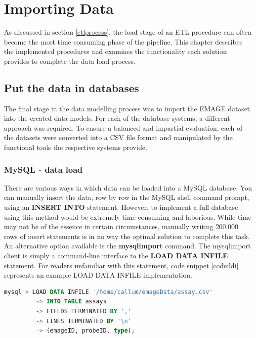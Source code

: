 \chapter{Importing Data}\label{dataload}
As discussed in section \ref{etlprocess}, the load stage of an ETL procedure can often become the most time consuming phase of the pipeline. This chapter describes the implemented procedures and examines the functionality each solution provides to complete the data load process.

\section{Put the data in databases}\label{loadsection}
The final stage in the data modelling process was to import the EMAGE dataset into the created data models. For each of the database systems, a different approach was required. To ensure a balanced and impartial evaluation, each of the datasets were converted into a CSV file format and manipulated by the functional tools the respective systems provide.

\subsection{MySQL - data load}
There are various ways in which data can be loaded into a MySQL database. You can manually insert the data, row by row in the MySQL shell command prompt, using an \textbf{INSERT INTO} statement. However, to implement a full database using this method would be extremely time consuming and laborious. While time may not be of the essence in certain circumstances, manually writing 200,000 rows of insert statements is in no way the optimal solution to complete this task. An alternative option available is the \textbf{mysqlimport} command. The mysqlimport client is simply a command-line interface to the \textbf{LOAD DATA INFILE} statement. For readers unfamiliar with this statement, code snippet \ref{code:ldi} represents an example LOAD DATA INFILE implementation.
\newpage
\begin{lstlisting}[language=SQL, caption=Example LOAD DATA INFILE statement., label=code:ldi]
mysql > LOAD DATA INFILE '/home/callum/emageData/assay.csv'
	 	 -> INTO TABLE assays
		 -> FIELDS TERMINATED BY ','
		 -> LINES TERMINATED BY '\n'
		 -> (emageID, probeID, type);
\end{lstlisting}

